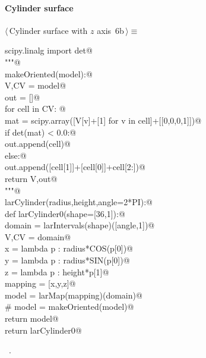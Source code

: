 \documentclass[11pt,oneside]{article}	%
\begin{document}
\paragraph{Cylinder surface}
\begin{flushleft} \small \label{scrap10}
\protect{}$\langle\,$Cylinder surface with $z$ axis\nobreak\ {\footnotesize 6b}$\,\rangle\equiv$
\vspace{-1ex}
\begin{list}{}{} \item
\mbox{}\verb@from scipy.linalg import det@\\
\mbox{}\verb@"""@\\
\mbox{}\verb@def makeOriented(model):@\\
\mbox{}\verb@   V,CV = model@\\
\mbox{}\verb@   out = []@\\
\mbox{}\verb@   for cell in CV: @\\
\mbox{}\verb@      mat = scipy.array([V[v]+[1] for v in cell]+[[0,0,0,1]])@\\
\mbox{}\verb@      if det(mat) < 0.0:@\\
\mbox{}\verb@         out.append(cell)@\\
\mbox{}\verb@      else:@\\
\mbox{}\verb@         out.append([cell[1]]+[cell[0]]+cell[2:])@\\
\mbox{}\verb@   return V,out@\\
\mbox{}\verb@"""@\\
\mbox{}\verb@def larCylinder(radius,height,angle=2*PI):@\\
\mbox{}\verb@   def larCylinder0(shape=[36,1]):@\\
\mbox{}\verb@      domain = larIntervals(shape)([angle,1])@\\
\mbox{}\verb@      V,CV = domain@\\
\mbox{}\verb@      x = lambda p : radius*COS(p[0])@\\
\mbox{}\verb@      y = lambda p : radius*SIN(p[0])@\\
\mbox{}\verb@      z = lambda p : height*p[1]@\\
\mbox{}\verb@      mapping = [x,y,z]@\\
\mbox{}\verb@      model = larMap(mapping)(domain)@\\
\mbox{}\verb@      # model = makeOriented(model)@\\
\mbox{}\verb@      return model@\\
\mbox{}\verb@   return larCylinder0@\\
\mbox{}\verb@@{\NWsep}
\end{list}
\vspace{-1ex}
\footnotesize\addtolength{\baselineskip}{-1ex}
\begin{list}{}{\setlength{\itemsep}{-\parsep}\setlength{\itemindent}{-\leftmargin}}
\item \NWtxtMacroRefIn\ .
\end{list}
\end{flushleft}
\end{document}
